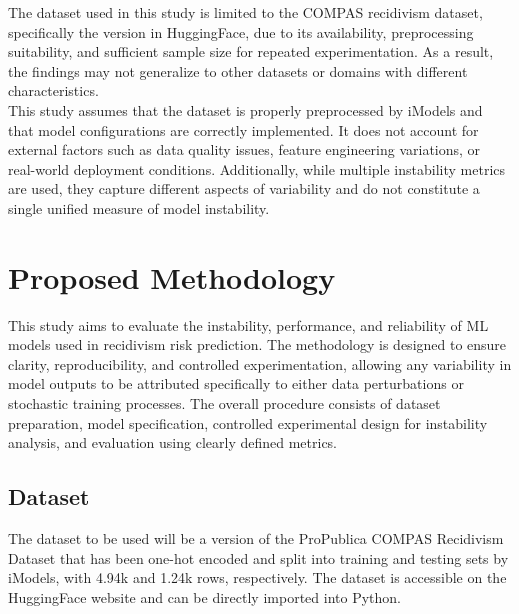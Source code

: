 \documentclass[12pt]{article}
\begin{document}
The dataset used in this study is limited to the COMPAS recidivism dataset, specifically the version in HuggingFace, due to its availability, preprocessing suitability, and sufficient sample size for repeated experimentation. As a result, the findings may not generalize to other datasets or domains with different characteristics.\\

This study assumes that the dataset is properly preprocessed by iModels and that model configurations are correctly implemented. It does not account for external factors such as data quality issues, feature engineering variations, or real-world deployment conditions. Additionally, while multiple instability metrics are used, they capture different aspects of variability and do not constitute a single unified measure of model instability.

\section{Proposed Methodology}
\tab This study aims to evaluate the instability, performance, and reliability of ML models used in recidivism risk prediction. The methodology is designed to ensure clarity, reproducibility, and controlled experimentation, allowing any variability in model outputs to be attributed specifically to either data perturbations or stochastic training processes. The overall procedure consists of dataset preparation, model specification, controlled experimental design for instability analysis, and evaluation using clearly defined metrics.

\subsection{Dataset} 
The dataset to be used will be a version of the ProPublica COMPAS Recidivism Dataset that has been one-hot encoded and split into training and testing sets by iModels, with 4.94k and 1.24k rows, respectively. The dataset is accessible on the HuggingFace website and can be directly imported into Python.
\end{document}
